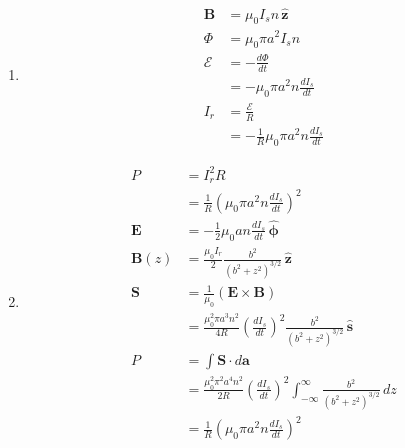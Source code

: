 \documentclass{article}
\renewcommand{\vec}[1]{\boldsymbol{\mathbf{#1}}}
\newcommand{\uvec}[1]{\hat{\vec{#1}}}
\begin{document}
\setcounter{subsection}{12}
\subsection{}

\begin{enumerate}
  \item

        \begin{align*}
          \vec{B}     & = \mu_0 I_s n \,\uvec{z}                         \\
          \Phi        & = \mu_0 \pi a^2 I_s n                            \\
          \mathcal{E} & = -\frac{d \Phi}{d t}                            \\
                      & = -\mu_0 \pi a^2 n \frac{d I_s}{d t}             \\
          I_r         & = \frac{\mathcal{E}}{R}                          \\
                      & = -\frac{1}{R} \mu_0 \pi a^2 n \frac{d I_s}{d t}
        \end{align*}

  \item

        \begin{align*}
          P          & = I_r^2 R                                                                                                                          \\
                     & = \frac{1}{R} \left( \mu_0 \pi a^2 n \frac{d I_s}{d t} \right)^2                                                                   \\
          \vec{E}    & = -\frac{1}{2} \mu_0 a n \frac{d I_s}{d t} \,\uvec{\phi}                                                                           \\
          \vec{B}(z) & = \frac{\mu_0 I_r}{2} \frac{b^2}{(b^2 + z^2)^{3 / 2}} \,\uvec{z}                                                                   \\
          \vec{S}    & = \frac{1}{\mu_0} (\vec{E} \times \vec{B})                                                                                         \\
                     & = \frac{\mu_0^2 \pi a^3 n^2}{4 R} \left( \frac{d I_s}{d t} \right)^2 \frac{b^2}{(b^2 + z^2)^{3 / 2}} \,\uvec{s}                    \\
          P          & = \int \vec{S} \cdot d \vec{a}                                                                                                     \\
                     & = \frac{\mu_0^2 \pi^2 a^4 n^2}{2 R} \left( \frac{d I_s}{d t} \right)^2 \int_{-\infty}^\infty \frac{b^2}{(b^2 + z^2)^{3 / 2}} \,d z \\
                     & = \frac{1}{R} \left( \mu_0 \pi a^2 n \frac{d I_s}{d t} \right)^2
        \end{align*}
\end{enumerate}
\end{document}
